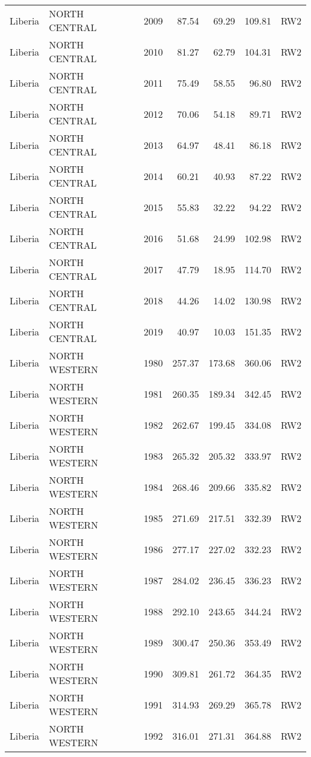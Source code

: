 \begin{longtable}{lllrrrl}
  Liberia & NORTH CENTRAL & 2009 & 87.54 & 69.29 & 109.81 & RW2 \\ 
  Liberia & NORTH CENTRAL & 2010 & 81.27 & 62.79 & 104.31 & RW2 \\ 
  Liberia & NORTH CENTRAL & 2011 & 75.49 & 58.55 & 96.80 & RW2 \\ 
  Liberia & NORTH CENTRAL & 2012 & 70.06 & 54.18 & 89.71 & RW2 \\ 
  Liberia & NORTH CENTRAL & 2013 & 64.97 & 48.41 & 86.18 & RW2 \\ 
  Liberia & NORTH CENTRAL & 2014 & 60.21 & 40.93 & 87.22 & RW2 \\ 
  Liberia & NORTH CENTRAL & 2015 & 55.83 & 32.22 & 94.22 & RW2 \\ 
  Liberia & NORTH CENTRAL & 2016 & 51.68 & 24.99 & 102.98 & RW2 \\ 
  Liberia & NORTH CENTRAL & 2017 & 47.79 & 18.95 & 114.70 & RW2 \\ 
  Liberia & NORTH CENTRAL & 2018 & 44.26 & 14.02 & 130.98 & RW2 \\ 
  Liberia & NORTH CENTRAL & 2019 & 40.97 & 10.03 & 151.35 & RW2 \\ 
  Liberia & NORTH WESTERN & 1980 & 257.37 & 173.68 & 360.06 & RW2 \\ 
  Liberia & NORTH WESTERN & 1981 & 260.35 & 189.34 & 342.45 & RW2 \\ 
  Liberia & NORTH WESTERN & 1982 & 262.67 & 199.45 & 334.08 & RW2 \\ 
  Liberia & NORTH WESTERN & 1983 & 265.32 & 205.32 & 333.97 & RW2 \\ 
  Liberia & NORTH WESTERN & 1984 & 268.46 & 209.66 & 335.82 & RW2 \\ 
  Liberia & NORTH WESTERN & 1985 & 271.69 & 217.51 & 332.39 & RW2 \\ 
  Liberia & NORTH WESTERN & 1986 & 277.17 & 227.02 & 332.23 & RW2 \\ 
  Liberia & NORTH WESTERN & 1987 & 284.02 & 236.45 & 336.23 & RW2 \\ 
  Liberia & NORTH WESTERN & 1988 & 292.10 & 243.65 & 344.24 & RW2 \\ 
  Liberia & NORTH WESTERN & 1989 & 300.47 & 250.36 & 353.49 & RW2 \\ 
  Liberia & NORTH WESTERN & 1990 & 309.81 & 261.72 & 364.35 & RW2 \\ 
  Liberia & NORTH WESTERN & 1991 & 314.93 & 269.29 & 365.78 & RW2 \\ 
  Liberia & NORTH WESTERN & 1992 & 316.01 & 271.31 & 364.88 & RW2 \\ 

\end{longtable}
